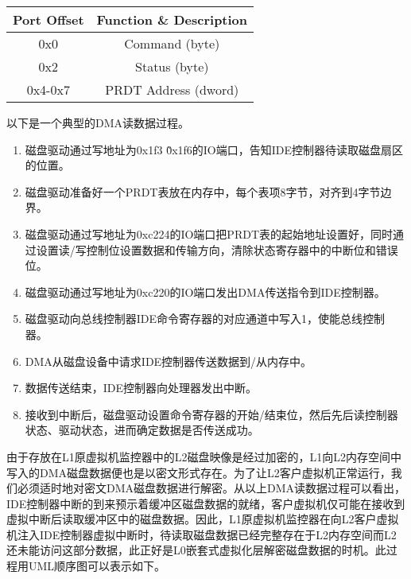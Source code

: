 \begin{table}[htpb]
\centering
\begin{tabular}{cc}
\toprule
Port Offset	& Function \& Description\\
\midrule
0x0	&Command (byte)\\
0x2	&Status (byte)\\
0x4-0x7 &PRDT Address (dword)\\
\bottomrule
\end{tabular}
\end{table}

以下是一个典型的DMA读数据过程。

\begin{enumerate}
\item 磁盘驱动通过写地址为0x1f3 \~0x1f6的IO端口，告知IDE控制器待读取磁盘扇区的位置。

\item 磁盘驱动准备好一个PRDT表放在内存中，每个表项8字节，对齐到4字节边界。

\item 磁盘驱动通过写地址为0xc224的IO端口把PRDT表的起始地址设置好，同时通过设置读/写控制位设置数据和传输方向，清除状态寄存器中的中断位和错误位。

\item 磁盘驱动通过写地址为0xc220的IO端口发出DMA传送指令到IDE控制器。

\item 磁盘驱动向总线控制器IDE命令寄存器的对应通道中写入1，使能总线控制器。

\item DMA从磁盘设备中请求IDE控制器传送数据到/从内存中。

\item 数据传送结束，IDE控制器向处理器发出中断。

\item 接收到中断后，磁盘驱动设置命令寄存器的开始/结束位，然后先后读控制器状态、驱动状态，进而确定数据是否传送成功。
\end{enumerate}

由于存放在L1原虚拟机监控器中的L2磁盘映像是经过加密的，L1向L2内存空间中写入的DMA磁盘数据便也是以密文形式存在。为了让L2客户虚拟机正常运行，我们必须适时地对密文DMA磁盘数据进行解密。从以上DMA读数据过程可以看出，IDE控制器中断的到来预示着缓冲区磁盘数据的就绪，客户虚拟机仅可能在接收到虚拟中断后读取缓冲区中的磁盘数据。因此，L1原虚拟机监控器在向L2客户虚拟机注入IDE控制器虚拟中断时，待读取磁盘数据已经完整存在于L2内存空间而L2还未能访问这部分数据，此正好是L0嵌套式虚拟化层解密磁盘数据的时机。此过程用UML顺序图可以表示如下。

